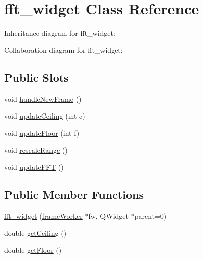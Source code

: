\hypertarget{classfft__widget}{\section{fft\+\_\+widget Class Reference}
\label{classfft__widget}
}


Inheritance diagram for fft\+\_\+widget\+:


Collaboration diagram for fft\+\_\+widget\+:
\subsection*{Public Slots}
\begin{DoxyCompactItemize}
\item 
void \hyperlink{group__renderfunc_gae1c220c6b7aa557feaa80d5fb02f904a}{handle\+New\+Frame} ()
\item 
void \hyperlink{group__plotfunc_gafb6e441944ce7497cfbeeed7e8d3d65c}{update\+Ceiling} (int c)
\item 
void \hyperlink{group__plotfunc_gadfd68dfa066e8e0d0bf69324176e01a4}{update\+Floor} (int f)
\item 
void \hyperlink{group__plotfunc_ga41f5dca22060a42641755916903aa6fa}{rescale\+Range} ()
\item 
void \hyperlink{group__plotfunc_ga2f62c754ab9b5df0aa7e4bc7b0ddc63b}{update\+F\+F\+T} ()
\end{DoxyCompactItemize}
\subsection*{Public Member Functions}
\begin{DoxyCompactItemize}
\item 
\hyperlink{classfft__widget_a0e65ada6fa69b8f172e4565325e13acb}{fft\+\_\+widget} (\hyperlink{classframeWorker}{frame\+Worker} $\ast$fw, Q\+Widget $\ast$parent=0)
\item 
double \hyperlink{group__getters_gad5640a1300a47010e98f518bd11ab56e}{get\+Ceiling} ()
\item 
double \hyperlink{group__getters_ga233ad29936526df1f61573a90698e644}{get\+Floor} ()
\end{DoxyCompactItemize}

